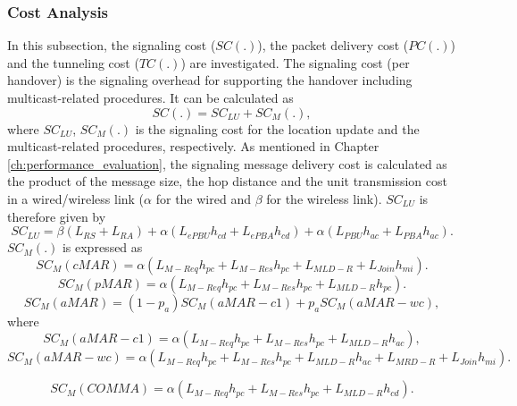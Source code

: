 \subsubsection{Cost Analysis}
In this subsection, the signaling cost ($SC(.)$), the packet delivery cost ($PC(.)$) and the tunneling cost ($TC(.)$) are investigated. The signaling cost (per handover) is the signaling overhead for supporting the handover including multicast-related procedures. It can be calculated as \\
\begin{equation}
SC(.) =SC_{LU} + SC_{M}(.),
\end{equation}
where $SC_{LU}$, $SC_{M}(.)$ is the signaling cost for the location update and the multicast-related procedures, respectively. As mentioned in Chapter \ref{ch:performance_evaluation}, the signaling message delivery cost is calculated as the product of the message size, the hop distance and the unit transmission cost in a wired/wireless link ($\alpha$ for the wired and $\beta$ for the wireless link). $SC_{LU}$ is therefore given by\\
\begin{equation}
SC_{LU} = \beta (L_{RS} + L_{RA}) + \alpha (L_{ePBU}  h_{cd} + L_{ePBA} h_{cd})  + \alpha (L_{PBU}  h_{ac} + L_{PBA} h_{ac}).
\end{equation}
$SC_{M}(.)$ is expressed as\\
\begin{equation}
SC_{M}(cMAR) = \alpha  (L_{M-Req}  h_{pc} + L_{M-Res} h_{pc} + L_{MLD-R} + L_{Join} h_{mi}).
\end{equation}
\begin{equation}
SC_{M}(pMAR) = \alpha (L_{M-Req}  h_{pc} + L_{M-Res} h_{pc} + L_{MLD-R} h_{pc}).
\end{equation}
\begin{equation}
SC_{M}(aMAR) =(1-p_{a}) SC_{M}(aMAR-c1)  + p_{a} SC_{M}(aMAR-wc),
\end{equation}
where 
\begin{equation}
SC_{M}(aMAR-c1) = \alpha (L_{M-Req}  h_{pc} + L_{M-Res} h_{pc} +L_{MLD-R} h_{ac}),
\end{equation}
\begin{equation}
SC_{M}(aMAR-wc) = \alpha (L_{M-Req}  h_{pc} + L_{M-Res} h_{pc}  + L_{MLD-R} h_{ac}+L_{MRD-R} +L_{Join} h_{mi}).
\end{equation}

\begin{equation}
SC_{M}(COMMA) = \alpha (L_{M-Req}  h_{pc} + L_{M-Res} h_{pc}  + L_{MLD-R} h_{cd}).
\end{equation}

